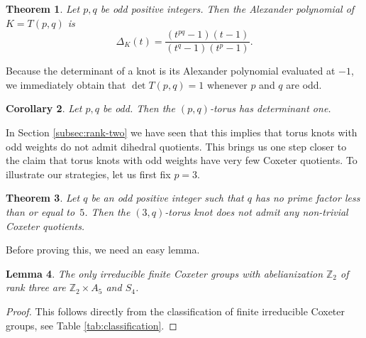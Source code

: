 \documentclass{article}
\newtheorem{theorem}{Theorem}[section]
\newtheorem{corollary}[theorem]{Corollary}
\newtheorem{lemma}[theorem]{Lemma}
\theoremstyle{definition}
\begin{document}
\begin{theorem}
Let $p, q$ be odd positive integers. Then the Alexander polynomial of $K = T(p, q)$ is
$$\Delta_K(t) = \frac{(t^{pq}-1)(t-1)}{(t^q-1)(t^p-1)}.$$
\end{theorem}

Because the determinant of a knot is its Alexander polynomial evaluated at $-1$, we immediately obtain that $\det T(p, q) = 1$ whenever $p$ and $q$ are odd.

\begin{corollary}
Let $p, q$ be odd. Then the $(p, q)$-torus has determinant one.
\end{corollary}

In Section \ref{subsec:rank-two} we have seen that this implies that torus knots with odd weights do not admit dihedral quotients. This brings us one step closer to the claim that torus knots with odd weights have very few Coxeter quotients. To illustrate our strategies, let us first fix $p = 3$.

\begin{theorem}\label{thm:p=3}
Let $q$ be an odd positive integer such that $q$ has no prime factor less than or equal to~$5$. Then the $(3, q)$-torus knot does not admit any non-trivial Coxeter quotients.
\end{theorem}

Before proving this, we need an easy lemma.

\begin{lemma}
The only irreducible finite Coxeter groups with abelianization $\mathbb{Z}_2$ of rank three are $\mathbb{Z}_2 \times A_5$ and $S_4$.
\end{lemma}

\begin{proof}
This follows directly from the classification of finite irreducible Coxeter groups, see Table \ref{tab:classification}.
\end{proof}
\end{document}
